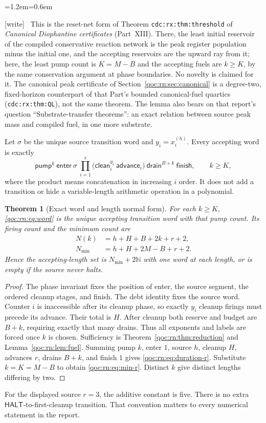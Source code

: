\documentclass[11pt,letterpaper]{article}
\newtheorem{theorem}{Theorem}[section]
\theoremstyle{definition}
\theoremstyle{remark}
\newcommand{\N}{\mathbb N}
\newcommand{\HALT}{\mathsf{HALT}}
\newcommand{\wtag}{\textup{[write]}}
\newenvironment{writenote}{\par\smallskip\begin{list}{}{\leftmargin=1.2em\rightmargin=0.6em}\item[]\small\wtag\ }{\end{list}\smallskip}
\newcommand{\lab}[1]{\nolinkurl{#1}}
\begin{document}
\begin{writenote}
This is the reset-net form of Theorem \lab{cdc:rx:thm:threshold} of \emph{Canonical Diophantine certificates} (Part~XIII). There, the least initial reservoir of the compiled conservative reaction network is the peak register population minus the initial one, and the accepting reservoirs are the upward ray from it; here, the least pump count is $K=M-B$ and the accepting fuels are $k\ge K$, by the same conservation argument at phase boundaries. No novelty is claimed for it. The canonical peak certificate of Section~\ref{qoc:rn:sec:canonical} is a degree-two, fixed-horizon counterpart of that Part's bounded canonical-fuel quartics (\lab{cdc:rx:thm:QL}), not the same theorem. The lemma also bears on that report's question ``Substrate-transfer theorems'': an exact relation between source peak mass and compiled fuel, in one more substrate.
\end{writenote}


Let $\sigma$ be the unique source transition word and $y_i=x_i^{(h)}$. Every accepting word is exactly
\begin{equation}
 \mathsf{pump}^{k}\ \mathsf{enter}\ \sigma\
 \prod_{i=1}^{r}\bigl(\mathsf{clean}_i^{y_i}\ \mathsf{advance}_i\bigr)\
 \mathsf{drain}^{B+k}\ \mathsf{finish},\qquad k\geq K,
 \label{qoc:rn:eq:word}
\end{equation}
where the product means concatenation in increasing $i$ order. It does not add a transition or hide a variable-length arithmetic operation in a polynomial.

\begin{theorem}[Exact word and length normal form]
For each $k\geq K$, \eqref{qoc:rn:eq:word} is the unique accepting transition word with that pump count. Its firing count and the minimum count are
\begin{align}
 N(k)&=h+H+B+2k+r+2,\label{qoc:rn:eq:duration-r}\\
 N_{\min}&=h+H+2M-B+r+2.\label{qoc:rn:eq:min-r}
\end{align}
Hence the accepting-length set is $N_{\min}+2\N$ with one word at each length, or is empty if the source never halts.
\end{theorem}
\begin{proof}
The phase invariant fixes the position of enter, the source segment, the ordered cleanup stages, and finish. The debt identity fixes the source word. Counter $i$ is inaccessible after its cleanup phase, so exactly $y_i$ cleanup firings must precede its advance. Their total is $H$. After cleanup both reserve and budget are $B+k$, requiring exactly that many drains. Thus all exponents and labels are forced once $k$ is chosen. Sufficiency is Theorem~\ref{qoc:rn:thm:reduction} and Lemma~\ref{qoc:rn:lem:fuel}. Summing pump $k$, enter $1$, source $h$, cleanup $H$, advances $r$, drains $B+k$, and finish $1$ gives \eqref{qoc:rn:eq:duration-r}. Substitute $k=K=M-B$ to obtain \eqref{qoc:rn:eq:min-r}. Distinct $k$ give distinct lengths differing by two.
\end{proof}
For the displayed source $r=3$, the additive constant is five. There is no extra $\HALT$-to-first-cleanup transition. That convention matters to every numerical statement in the report.
\end{document}

